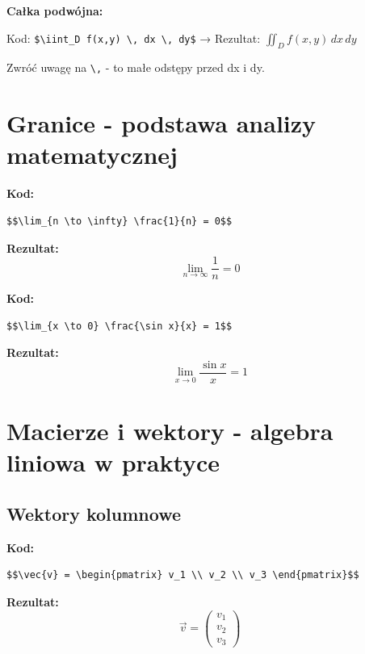 \documentclass[
  polish,
  letterpaper,
  DIV=11,
  numbers=noendperiod]{scrreprt}
\begin{document}
\textbf{Całka podwójna:}

Kod:
\texttt{\$\textbackslash{}iint\_D\ f(x,y)\ \textbackslash{},\ dx\ \textbackslash{},\ dy\$}
→ Rezultat: \(\iint_D f(x,y) \, dx \, dy\)

Zwróć uwagę na \texttt{\textbackslash{},} - to małe odstępy przed dx i
dy.

\section{Granice - podstawa analizy
matematycznej}\label{granice---podstawa-analizy-matematycznej}

\textbf{Kod:}

\begin{verbatim}
$$\lim_{n \to \infty} \frac{1}{n} = 0$$
\end{verbatim}

\textbf{Rezultat:} \[\lim_{n \to \infty} \frac{1}{n} = 0\]

\textbf{Kod:}

\begin{verbatim}
$$\lim_{x \to 0} \frac{\sin x}{x} = 1$$
\end{verbatim}

\textbf{Rezultat:} \[\lim_{x \to 0} \frac{\sin x}{x} = 1\]

\section{Macierze i wektory - algebra liniowa w
praktyce}\label{macierze-i-wektory---algebra-liniowa-w-praktyce}

\subsection{Wektory kolumnowe}\label{wektory-kolumnowe}

\textbf{Kod:}

\begin{verbatim}
$$\vec{v} = \begin{pmatrix} v_1 \\ v_2 \\ v_3 \end{pmatrix}$$
\end{verbatim}

\textbf{Rezultat:}
\[\vec{v} = \begin{pmatrix} v_1 \\ v_2 \\ v_3 \end{pmatrix}\]
\end{document}
